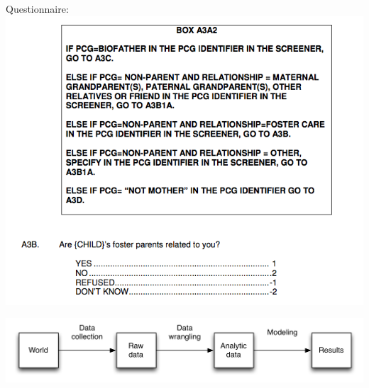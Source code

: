 \documentclass{beamer}
\begin{document}
\begin{frame}

Questionnaire:\\
\centering\includegraphics[width = .8\textwidth]{figures/Doc4}

\end{frame}

\begin{frame}

\begin{center}
\includegraphics[width=\textwidth]{figures/scientific_pipeline}
\end{center}

\end{frame}
\end{document}
